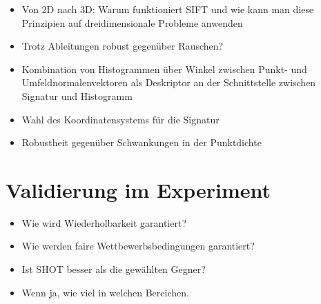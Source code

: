 \documentclass[12pt]{article}
\begin{document}
\begin{itemize}
	\item{ 
		Von 2D nach 3D: Warum funktioniert SIFT und wie kann man diese Prinzipien auf dreidimensionale Probleme anwenden}
	\item{
		Trotz Ableitungen robust gegenüber Rauschen? 
	} 
	\item {
		Kombination von Histogrammen über Winkel zwischen Punkt- und Umfeldnormalenvektoren als Deskriptor an der Schnittstelle zwischen Signatur und Histogramm
	}
	\item{
		Wahl des Koordinatensystems für die Signatur
	}
	\item{
		Robustheit gegenüber Schwankungen in der Punktdichte
	}
\end{itemize}

\section{Validierung im Experiment}
\begin{itemize}
	\item Wie wird Wiederholbarkeit garantiert?
	\item Wie werden faire Wettbewerbsbedingungen garantiert?
	\item Ist SHOT besser als die gewählten Gegner?
	\item Wenn ja, wie viel in welchen Bereichen.
\end{itemize}






\end{document}
